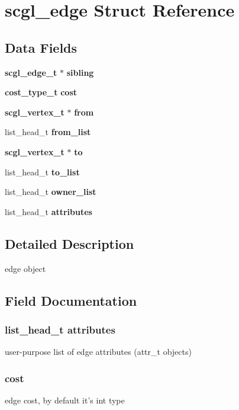 \section{scgl\-\_\-edge Struct Reference}
\label{structscgl__edge}
\subsection*{Data Fields}
\begin{DoxyCompactItemize}
\item 
{\bf scgl\-\_\-edge\-\_\-t} $\ast$ {\bf sibling}
\item 
{\bf cost\-\_\-type\-\_\-t} {\bf cost}
\item 
{\bf scgl\-\_\-vertex\-\_\-t} $\ast$ {\bf from}
\item 
list\-\_\-head\-\_\-t {\bf from\-\_\-list}
\item 
{\bf scgl\-\_\-vertex\-\_\-t} $\ast$ {\bf to}
\item 
list\-\_\-head\-\_\-t {\bf to\-\_\-list}
\item 
list\-\_\-head\-\_\-t {\bf owner\-\_\-list}
\item 
list\-\_\-head\-\_\-t {\bf attributes}
\end{DoxyCompactItemize}


\subsection{Detailed Description}
edge object 

\subsection{Field Documentation}
\subsubsection[{attributes}]{\setlength{\rightskip}{0pt plus 5cm}list\-\_\-head\-\_\-t {\bf attributes}}\label{structscgl__edge_a35b0b90071708fc088a15f65ccdf63b4}
user-\/purpose list of edge attributes (attr\-\_\-t objects) 
\subsubsection[{cost}]{ {\bf cost}}\label{structscgl__edge_a810ad7c2808df6bed0a30517197768e6}
edge cost, by default it's int type 
